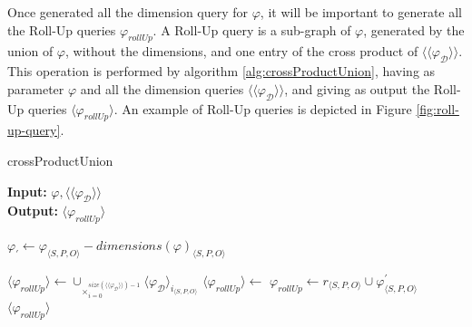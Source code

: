 \documentclass[12pt,a4paper]{report}
\newcommand\globalQuery{\varphi}
\newcommand\rollUpQuery{\varphi_{rollUp}}
\newcommand\subject{S}
\newcommand\predicate{P}
\newcommand\object{O}
\newcommand\triple[1]{#1_{\set{\subject,\predicate,\object}}}
\newcommand\dimension{\mathcal{D}}
\newcommand\dimensions{dimensions}
\newcommand\set[1]{\langle #1 \rangle}
\newcommand\dimensionQuery{\globalQuery_{\dimension}}
\begin{document}
Once generated all the dimension query for $\globalQuery$, it will be important to generate all the Roll-Up queries $\rollUpQuery$.
%
A Roll-Up query is a sub-graph of $\globalQuery$, generated by the union of $\globalQuery$, without the dimensions, and one entry of the cross product of $\set{\set{\dimensionQuery}}$.
%
This operation is performed by algorithm \ref{alg:crossProductUnion}, having as parameter $\globalQuery$ and all the dimension queries $\set{\set{\dimensionQuery}}$, and giving as output the Roll-Up queries $\set{\rollUpQuery}$.
%
An example of Roll-Up queries is depicted in Figure \ref{fig:roll-up-query}.
%
\begin{algorithm}[ht]
\caption{crossProductUnion}\label{alg:crossProductUnion}
\textbf{Input:} $\globalQuery,\set{\set{\dimensionQuery}}$\\
\textbf{Output:} $\set{\rollUpQuery}$
\begin{algorithmic}[1]
\State $\globalQuery_{'} \gets \triple{\globalQuery} - \triple{\dimensions(\globalQuery)}$

\State $\set{\rollUpQuery} \gets \cup_{\times}_{i = 0}^{size(\set{\set{\dimensionQuery}}) - 1}\triple{\set{\dimensionQuery}_{i}}$
\State $\set{\rollUpQuery} \gets$
\ForEach {$r \in \set{\rollUpQuery}$}
    \State $\rollUpQuery \gets \triple{r} \cup \triple{\globalQuery^{'}}$
\EndFor
\State \Return $\set{\rollUpQuery}$
\end{algorithmic}
\end{algorithm}
\end{document}
